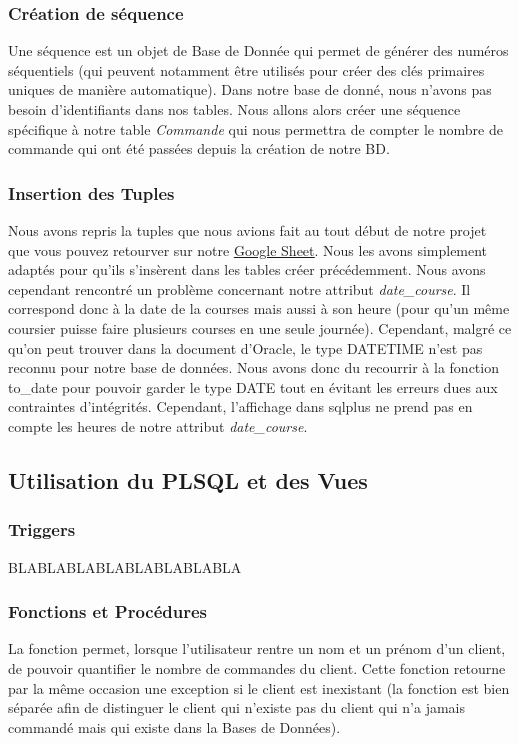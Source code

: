 \documentclass[french]{article}
\begin{document}
        \subsubsection*{Création de séquence}
            Une séquence est un objet de Base de Donnée qui permet de générer des numéros séquentiels (qui peuvent notamment être utilisés pour créer des clés primaires uniques de manière automatique). Dans notre base de donné, nous n'avons pas besoin d'identifiants dans nos tables. Nous allons alors créer une séquence spécifique à notre table \textit{Commande} qui nous permettra de compter le nombre de commande qui ont été passées depuis la création de notre BD.

        \subsubsection*{Insertion des Tuples}
            Nous avons repris la tuples que nous avions fait au tout début de notre projet que vous pouvez retourver sur notre \href{https://docs.google.com/spreadsheets/d/1HeSNFvLN3-yMfWHoYLVumzOeQpHXJHynqVBusbvl6EQ/edit?usp=sharing}{\underline{Google Sheet}}. Nous les avons simplement adaptés pour qu'ils s'insèrent dans les tables créer précédemment.\newline
            Nous avons cependant rencontré un problème concernant notre attribut \textit{date\_course}. Il correspond donc à la date de la courses mais aussi à son heure (pour qu'un même coursier puisse faire plusieurs courses en une seule journée). Cependant, malgré ce qu'on peut trouver dans la document d'Oracle, le type DATETIME n'est pas reconnu pour notre base de données. Nous avons donc du recourrir à la fonction to\_date pour pouvoir garder le type DATE tout en évitant les erreurs dues aux contraintes d'intégrités. Cependant, l'affichage dans sqlplus ne prend pas en compte les heures de notre attribut \textit{date\_course}. 

        \subsection*{Utilisation du PLSQL et des Vues}

            \subsubsection*{Triggers}
                BLABLABLABLABLABLABLABLA
            
            \subsubsection*{Fonctions et Procédures}
            La fonction permet, lorsque l'utilisateur rentre un nom et un prénom d'un client, de pouvoir quantifier le nombre de commandes du client.
            Cette fonction retourne par la même occasion une exception si le client est inexistant (la fonction est bien séparée afin de distinguer le client qui n'existe pas du client qui n'a jamais commandé mais qui existe dans la Bases de Données).
            
\end{document}
